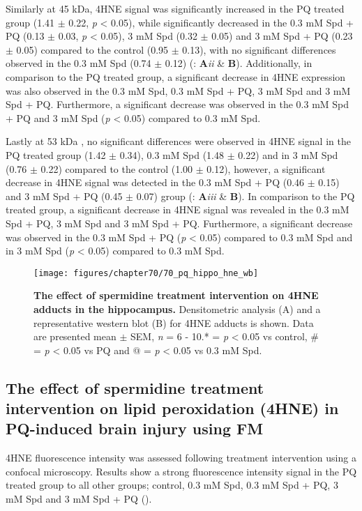 Similarly at 45 kDa, 4HNE signal was significantly increased in the PQ treated group (1.41 $\pm$ 0.22, \textit{p} < 0.05), while significantly decreased in the 0.3 mM Spd + PQ (0.13 $\pm$ 0.03, \textit{p} < 0.05), 3 mM Spd (0.32 $\pm$ 0.05) and 3 mM Spd + PQ (0.23 $\pm$ 0.05) compared to the control (0.95 $\pm$ 0.13), with no significant differences observed in the 0.3 mM Spd (0.74 $\pm$ 0.12) (: \textbf{A}\textit{ii} \& \textbf{B}). Additionally, in comparison to the PQ treated group, a significant decrease in 4HNE expression was also observed in the 0.3 mM Spd, 0.3 mM Spd + PQ, 3 mM Spd and 3 mM Spd + PQ. Furthermore, a significant decrease was observed in the 0.3 mM Spd + PQ and 3 mM Spd (\textit{p} < 0.05) compared to 0.3 mM Spd.

Lastly at 53 kDa , no significant differences were observed in 4HNE signal in the PQ treated group (1.42 $\pm$ 0.34), 0.3 mM Spd (1.48 $\pm$ 0.22) and in 3 mM Spd (0.76 $\pm$ 0.22) compared to the control (1.00 $\pm$ 0.12), however, a significant decrease in 4HNE signal was detected in the 0.3 mM Spd + PQ (0.46 $\pm$ 0.15) and 3 mM Spd + PQ (0.45 $\pm$ 0.07) group (: \textbf{A}\textit{iii} \& \textbf{B}). In comparison to the PQ treated group, a significant decrease in 4HNE signal was revealed in the 0.3 mM Spd + PQ, 3 mM Spd and 3 mM Spd + PQ. Furthermore, a significant decrease was observed in the 0.3 mM Spd + PQ (\textit{p} < 0.05) compared to 0.3 mM Spd and in 3 mM Spd (\textit{p} < 0.05) compared to 0.3 mM Spd. 

\begin{landscape}
\begin{figure}[!htbp]
\center
  \texttt{[image: figures/chapter70/70\_pq\_hippo\_hne\_wb]}
  \caption[The effect of spermidine treatment intervention on 4HNE adducts in the hippocampus]{\textbf{The effect of spermidine treatment intervention on 4HNE adducts in the hippocampus.} Densitometric analysis (A) and a representative western blot (B) for 4HNE adducts is shown. Data are presented  mean $\pm$ SEM, \textit{n} = 6 - 10.* = \textit{p} < 0.05 vs control, \# = \textit{p} < 0.05 vs PQ and @ = \textit{p} < 0.05 vs 0.3 mM Spd.}
  \label{fig:70_pq_hippo_hne_wb}
\end{figure} 
\end{landscape}

\subsection{The effect of spermidine treatment intervention on lipid peroxidation (4HNE) in PQ-induced brain injury using FM}
4HNE fluorescence intensity was assessed following treatment intervention using a confocal microscopy. Results show a strong fluorescence intensity signal in the PQ treated group to all other groups; control, 0.3 mM Spd, 0.3 mM Spd + PQ, 3 mM Spd and 3 mM Spd + PQ ().

